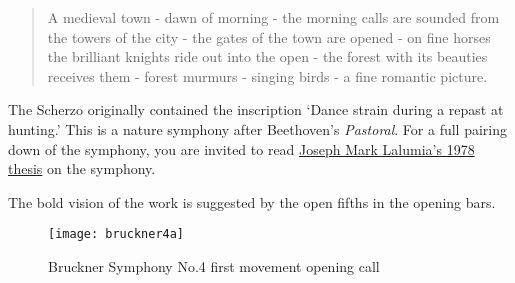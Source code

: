 \begin{quotation}
A medieval town - dawn of morning - the morning calls are sounded from the towers of the city - the gates of the town are opened - on fine horses the brilliant knights ride out into the open - the forest with its beauties receives them - forest murmurs - singing birds - a fine romantic picture. 
\end{quotation}

The Scherzo originally contained the inscription `Dance strain during a repast at hunting.' This is a nature symphony after Beethoven's \textit{Pastoral}. For a full pairing down of the symphony, you are invited to read \href{https://urresearch.rochester.edu/institutionalPublicationPublicView.action?institutionalItemId=5839}{Joseph Mark Lalumia's 1978 thesis} on the symphony. 

The bold vision of the work is suggested by the open fifths in the opening bars. 

\begin{figure}[H]
\centering
\texttt{[image: bruckner4a]}\caption{Bruckner Symphony No.4 first movement opening call}
\label{fig:bruckner1a}
\end{figure}







